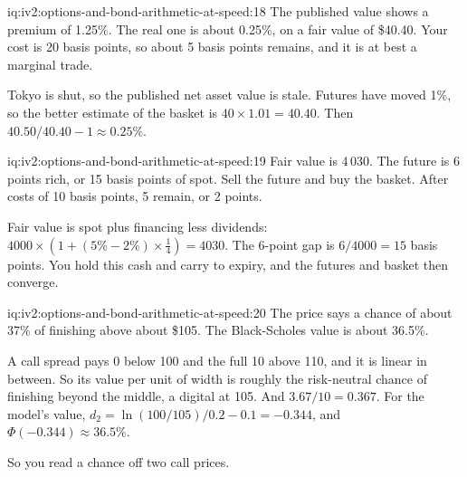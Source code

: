\begin{solution}{iq:iv2:options-and-bond-arithmetic-at-speed:18}
The published value shows a premium of 1.25\%. The real one is about 0.25\%, on a fair value of \$40.40. Your cost is 20 basis points, so about 5 basis points remains, and it is at best a marginal trade.

Tokyo is shut, so the published net asset value is stale. Futures have moved 1\%, so the better estimate of the basket is $40 \times 1.01 = 40.40$. Then $40.50/40.40 - 1 \approx 0.25\%$.

\end{solution}

\begin{solution}{iq:iv2:options-and-bond-arithmetic-at-speed:19}
Fair value is 4\,030. The future is 6 points rich, or 15 basis points of spot. Sell the future and buy the basket. After costs of 10 basis points, 5 remain, or 2 points.

Fair value is spot plus financing less dividends: $4000 \times (1 + (5\% - 2\%) \times \tfrac14) = 4030$. The 6-point gap is $6/4000 = 15$ basis points. You hold this cash and carry to expiry, and the futures and basket then converge.

\end{solution}

\begin{solution}{iq:iv2:options-and-bond-arithmetic-at-speed:20}
The price says a chance of about 37\% of finishing above about \$105. The Black-Scholes value is about 36.5\%.

A call spread pays 0 below 100 and the full 10 above 110, and it is linear in between. So its value per unit of width is roughly the risk-neutral chance of finishing beyond the middle, a digital at 105. And $3.67/10 = 0.367$. For the model's value, $d_2 = \ln(100/105)/0.2 - 0.1 = -0.344$, and $\Phi(-0.344) \approx 36.5\%$.

So you read a chance off two call prices.

\end{solution}

